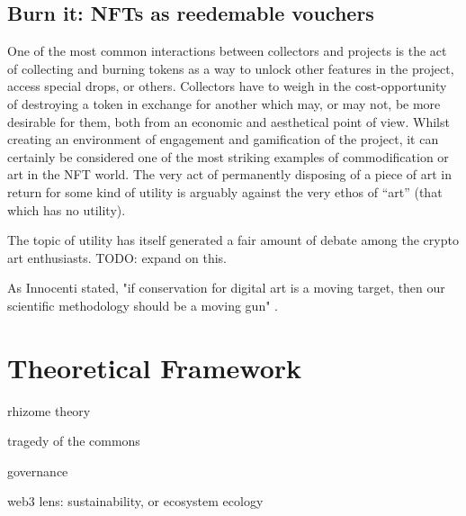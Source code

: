 \subsection{Burn it: NFTs as reedemable vouchers}

One of the most common interactions between collectors and projects is the act of collecting and burning tokens as a way to unlock other features in the project, access special drops, or others. Collectors have to weigh in the cost-opportunity of destroying a token in exchange for another which may, or may not, be more desirable for them, both from an economic and aesthetical point of view. Whilst creating an environment of engagement and gamification of the project, it can certainly be considered one of the most striking examples of commodification or art in the NFT world. The very act of permanently disposing of a piece of art in return for some kind of utility is arguably against the very ethos of ``art'' (that which has no utility).

The topic of utility has itself generated a fair amount of debate among the crypto art enthusiasts. TODO: expand on this.



As Innocenti stated, "if conservation for digital art is a moving target, then our scientific methodology should be a moving gun" \citeyear[p.230]{innocentiKeepingBitsAlive2013}.



\section{Theoretical Framework}

\todo rhizome theory

tragedy of the commons \cite{feenyTragedyCommonsTwentytwo1990}

governance \cite{gaziCodeWeTrust2024}


\todo web3 lens: sustainability, or ecosystem ecology






